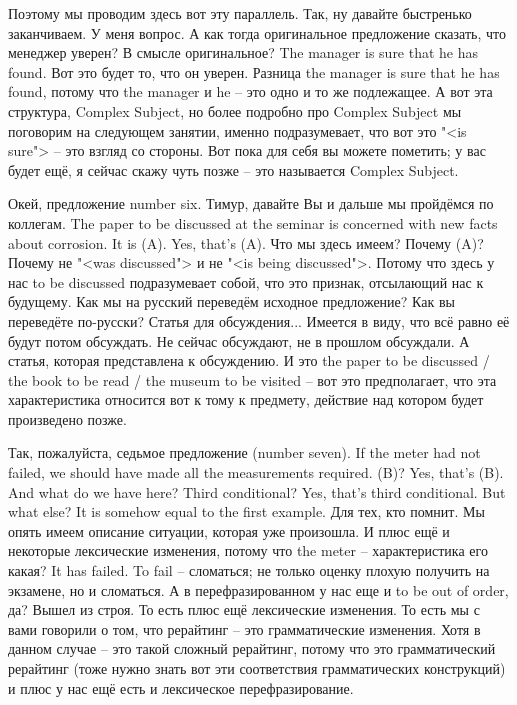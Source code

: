 \documentclass[main.tex]{subfiles}
\begin{document}
Поэтому мы проводим здесь вот эту параллель.
Так, ну давайте быстренько заканчиваем.
У меня вопрос.
А как тогда оригинальное предложение сказать, что менеджер уверен?
В смысле оригинальное?
The manager is sure that he has found.
Вот это будет то, что он уверен.
Разница the manager is sure that he has found, потому что the manager и he -- это одно и то же подлежащее.
А вот эта структура, Complex Subject, но более подробно про Complex Subject мы поговорим на следующем занятии, именно подразумевает, что вот это "<is sure"> -- это взгляд со стороны.
Вот пока для себя вы можете пометить; у вас будет ещё, я сейчас скажу чуть позже -- это называется Complex Subject.

Окей, предложение number six.
Тимур, давайте Вы и дальше мы пройдёмся по коллегам.
The paper to be discussed at the seminar is concerned with new facts about corrosion.
It is (A).
Yes, that's (A).
Что мы здесь имеем?
Почему (A)?
Почему не "<was discussed"> и не "<is being discussed">.
Потому что здесь у нас to be discussed подразумевает собой, что это признак, отсылающий нас к будущему.
Как мы на русский переведём исходное предложение?
Как вы переведёте по-русски?
Статья для обсуждения...
Имеется в виду, что всё равно её будут потом обсуждать.
Не сейчас обсуждают, не в прошлом обсуждали.
А статья, которая представлена к обсуждению.
И это the paper to be discussed / the book to be read / the museum to be visited -- вот это предполагает, что эта характеристика относится вот к тому к предмету, действие над котором будет произведено позже.

Так, пожалуйста, седьмое предложение (number seven).
If the meter had not failed, we should have made all the measurements required.
(B)?
Yes, that's (B).
And what do we have here?
Third conditional?
Yes, that's third conditional.
But what else?
It is somehow equal to the first example.
Для тех, кто помнит.
Мы опять имеем описание ситуации, которая уже произошла.
И плюс ещё и некоторые лексические изменения, потому что the meter -- характеристика его какая?
It has failed.
To fail -- сломаться; не только оценку плохую получить на экзамене, но и сломаться.
А в перефразированном у нас еще и to be out of order, да?
Вышел из строя.
То есть плюс ещё лексические изменения.
То есть мы с вами говорили о том, что рерайтинг -- это грамматические изменения.
Хотя в данном случае -- это такой сложный рерайтинг, потому что это грамматический рерайтинг (тоже нужно знать вот эти соответствия грамматических конструкций) и плюс у нас ещё есть и лексическое перефразирование.
\end{document}
